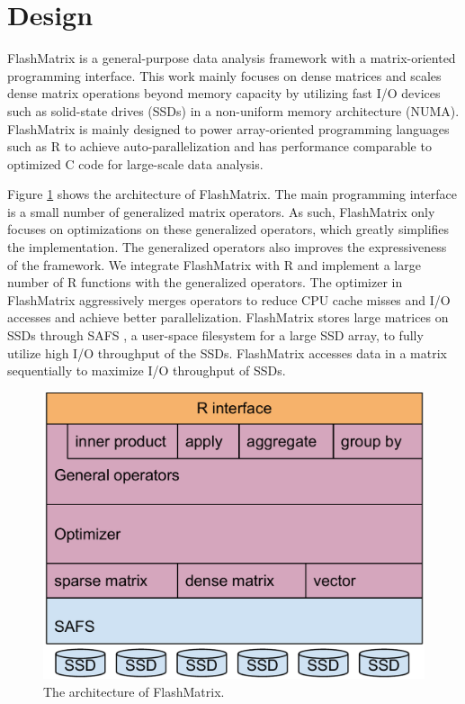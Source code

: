 \section{Design}

FlashMatrix is a general-purpose data analysis framework with a matrix-oriented
programming interface. This work mainly focuses on dense matrices and scales
dense matrix operations beyond memory capacity by utilizing fast I/O devices
such as solid-state drives (SSDs) in a non-uniform memory architecture (NUMA).
FlashMatrix is mainly designed to power
array-oriented programming languages such as R \cite{} to achieve
auto-parallelization and has performance comparable to optimized C code for
large-scale data analysis.

Figure \ref{fig:arch} shows the architecture of FlashMatrix. The main programming
interface is a small number of generalized matrix operators. As such,
FlashMatrix only focuses on optimizations on these generalized operators,
which greatly simplifies the implementation. The generalized operators also
improves the expressiveness of the framework. We integrate FlashMatrix with R
and implement a large number of R functions with the generalized operators.
The optimizer in FlashMatrix aggressively merges operators to reduce CPU cache
misses and I/O accesses and achieve better parallelization.
FlashMatrix stores large matrices on SSDs through SAFS \cite{safs},
a user-space filesystem for a large SSD array, to fully utilize high I/O
throughput of the SSDs. FlashMatrix accesses data in a matrix sequentially
to maximize I/O throughput of SSDs.

\begin{figure}
\centering
\includegraphics[scale=0.3]{./architecture.pdf}
\caption{The architecture of FlashMatrix.}
\label{fig:arch}
\end{figure}

